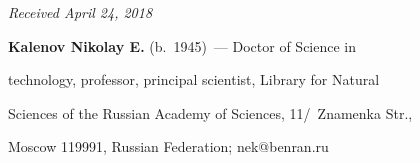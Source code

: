 \vspace*{-3pt}





\hfill{\small\textit{Received April 24, 2018}}





\Contrl





\noindent


\textbf{Kalenov Nikolay E.} (b.\ 1945)~--- Doctor of Science in 


technology, professor, principal scientist, Library for Natural 


Sciences of the Russian Academy of Sciences, 11\!/~Znamenka Str., 


Moscow 119991, Russian Federation; \mbox{nek@benran.ru}











\label{end\stat}








\renewcommand{\bibname}{\protect\rm Литература}


